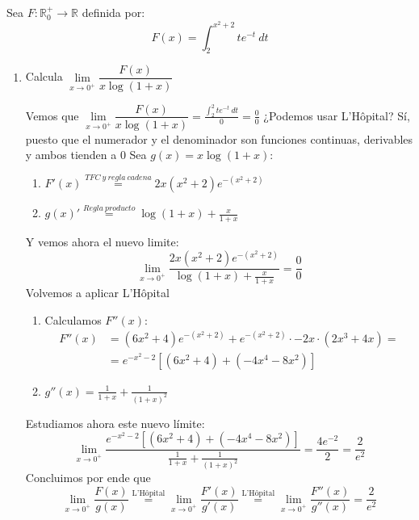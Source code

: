 \documentclass[12pt]{article}
\begin{document}
\begin{ejercicio}
        Sea $F:\mathbb{R}^+_0\longrightarrow \mathbb{R}$ definida por:
        \begin{equation*}
            F(x) = \int_{2}^{x^2+2} te^{-t}~dt 
        \end{equation*}
        \begin{enumerate}[label=\alph*)]
            \item Calcula $\lim\limits_{x\to0^+}\dfrac{F(x)}{x\log(1+x)}$

            Vemos que 
            $\lim\limits_{x\to0^+}\dfrac{F(x)}{x\log(1+x)} = \frac{\int_{2}^{2} te^{-t}~dt}{0} = \frac 00 $
            ¿Podemos usar L'Hôpital? Sí, puesto que el numerador y el denominador son funciones continuas, derivables y ambos tienden a 0\newline \newline
            Sea $g(x)=x\log(1+x):$
            \begin{enumerate}
                \item $F'(x) \overset{TFC \ y \ regla \ cadena}{=} 2x(x^2 + 2)e^{-(x^2 + 2)}$
                \item $g(x)'\overset{Regla\ producto} = \log(1 + x) + \frac{x}{1 + x}$
            \end{enumerate}
            Y vemos ahora el nuevo limite:
            $$\lim_{x \to 0^+} \frac{2x(x^2 + 2)e^{-(x^2 + 2)}}{\log(1 + x) + \frac{x}{1 + x}} = \frac00$$ Volvemos a aplicar L'Hôpital
            \begin{enumerate}
                \item Calculamos $F''(x)$:
                \begin{align*}
                    F''(x)&=(6x^2+4)e^{-(x^2+2)}+e^{-(x^2+2)}\cdot -2x \cdot (2x^3+4x)=\\&= e^{-x^2-2}[(6x^2+4)+(-4x^4-8x^2)]
                \end{align*}
                \item $g''(x) = \frac1{1+x}+\frac1{(1+x)^2}$
            \end{enumerate}
            Estudiamos ahora este nuevo límite:
            $$\lim\limits_{x\to0^+}\frac{e^{-x^2-2}[(6x^2+4)+(-4x^4-8x^2)]}{\frac1{1+x}+\frac1{(1+x)^2}} = \frac{4e^{-2}}2 = \frac2{e^2}$$
            Concluimos por ende que 
            $$\boxed{\lim\limits_{x\to0^+}\dfrac{F(x)}{g(x)} \overset{\text{L'Hôpital}}{=}\lim\limits_{x\to0^+}\dfrac{F'(x)}{g'(x)}\overset{\text{L'Hôpital}}{=}\lim\limits_{x\to0^+}\dfrac{F''(x)}{g''(x)} = \frac2{e^2}}$$
            

\end{enumerate}
\end{ejercicio}
\end{document}
